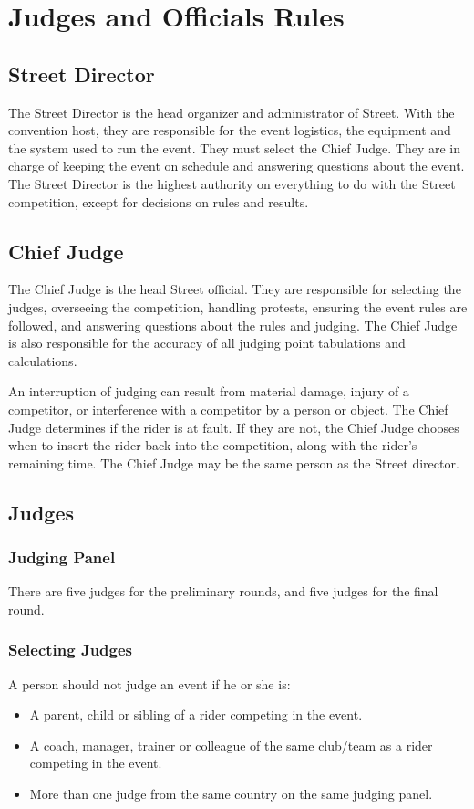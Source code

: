 \chapter{Judges and Officials Rules}

\section{Street Director}

The Street Director is the head organizer and administrator of Street.
With the convention host, they are responsible for the event logistics, the equipment and the system used to run the event.
They must select the Chief Judge.
They are in charge of keeping the event on schedule and answering questions about the event.
The Street Director is the highest authority on everything to do with the Street competition, except for decisions on rules and results.

\section{Chief Judge}

The Chief Judge is the head Street official.
They are responsible for selecting the judges, overseeing the competition, handling protests, ensuring the event rules are followed, and answering questions about the rules and judging.
The Chief Judge is also responsible for the accuracy of all judging point tabulations and calculations.

An interruption of judging can result from material damage, injury of a competitor, or interference with a competitor by a person or object.
The Chief Judge determines if the rider is at fault.
If they are not, the Chief Judge chooses when to insert the rider back into the competition, along with the rider's remaining time.
The Chief Judge may be the same person as the Street director.

\section{Judges}

\subsection{Judging Panel}

There are five judges for the preliminary rounds, and five judges for the final round.

\subsection{Selecting Judges}
A person should not judge an event if he or she is:
\begin{itemize}
\item A parent, child or sibling of a rider competing in the event.
\item A coach, manager, trainer or colleague of the same club/team as a rider competing in the event.
\item More than one judge from the same country on the same judging panel.
\end{itemize}

